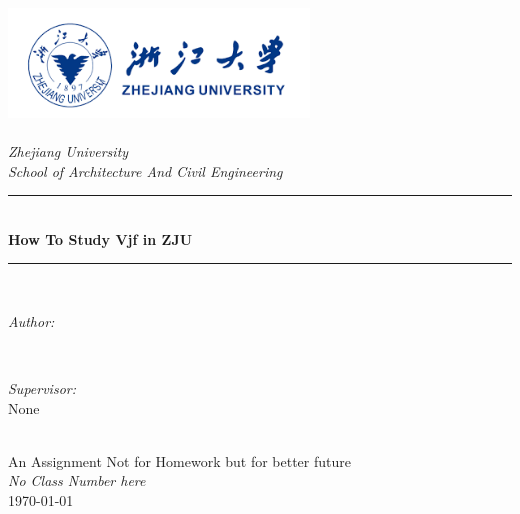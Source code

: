 \documentclass[10pt]{article}
\author{Kailian Jacy}
\begin{document}
 
\begin{titlepage}
	\newcommand{\HRule}{\rule{\linewidth}{0.5mm}}
	\includegraphics[width=8cm]{fig/zjulogo.png}\\[1cm] 
	\center 
	\quad\\[1.5cm]
	\textsl{\Large Zhejiang University }\\[0.5cm] 
	\textsl{\large School of Architecture And Civil Engineering}\\[0.5cm] 
	\makeatletter
	\HRule \\[0.4cm]
	{ \huge \bfseries How To Study Vjf in ZJU}\\[0.4cm] 
	\HRule \\[1.5cm]
	\begin{minipage}{0.4\textwidth}
		\begin{flushleft} \large
			\emph{Author:}\\
			\@author 
		\end{flushleft}
	\end{minipage}
	~
	\begin{minipage}{0.4\textwidth}
		\begin{flushright} \large
			\emph{Supervisor:} \\
			\textup{None}
		\end{flushright}
	\end{minipage}\\[3cm]
	\makeatother
	{\large An Assignment Not for Homework but for better future}\\[0.5cm]
	{\large \emph{No Class Number here}}\\[0.5cm]
	{\large \today}\\[2cm] 
	\vfill 
\end{titlepage}

 
\setlength{\parindent}{2em}
 
 
\end{document}
